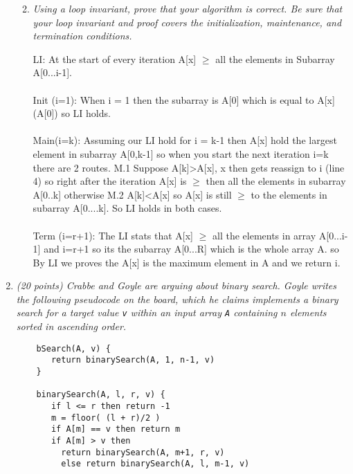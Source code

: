 \documentclass[12pt]{article}
\begin{document}
\begin{enumerate}
\begin{enumerate}
\begin{verbatim}
\end{verbatim}



 	\item \textit{Using a loop invariant, prove that your algorithm is correct. Be sure that your loop invariant and proof covers the initialization, maintenance, and termination conditions.}

LI: At the start of every iteration A[x] $\geq$ all the elements in Subarray A[0...i-1]. \\
\\ 
Init (i=1): When i = 1 then the subarray is A[0] which is equal to A[x] (A[0]) so LI holds. 
\\ \\
Main(i=k): Assuming our LI hold for i = k-1 then A[x] hold the largest element in subarray A[0,k-1] so when you start the next iteration i=k there are 2 routes. M.1 Suppose A[k]>A[x], x then gets reassign to i (line 4) so right after the iteration A[x] is $\geq$ then all the elements in subarray A[0..k] otherwise M.2 A[k]<A[x] so A[x] is still $\geq$ to the elements in subarray A[0....k]. So LI holds in both cases.
\\ \\
Term (i=r+1): The LI stats that A[x] $\geq$ all the elements in array A[0...i-1] and i=r+1 so its the subarray A[0...R] which is the whole array A. so By LI we proves the A[x] is the maximum element in A and we return i.

 	\end{enumerate}

	\newpage

	\item\textit{ (20 points) Crabbe and Goyle are arguing about binary search. Goyle writes the following pseudocode on the board, which he claims implements a binary search for a target value {\tt v} within an input array {\tt A} containing $n$ elements sorted in ascending order.}
	\begin{small}
	\begin{verbatim}
	bSearch(A, v) {
	   return binarySearch(A, 1, n-1, v)
	}

	binarySearch(A, l, r, v) {
	   if l <= r then return -1
	   m = floor( (l + r)/2 )
	   if A[m] == v then return m
	   if A[m] > v then
	     return binarySearch(A, m+1, r, v)
	     else return binarySearch(A, l, m-1, v)
	\end{verbatim}
	\end{small}


\end{enumerate}
\end{document}
